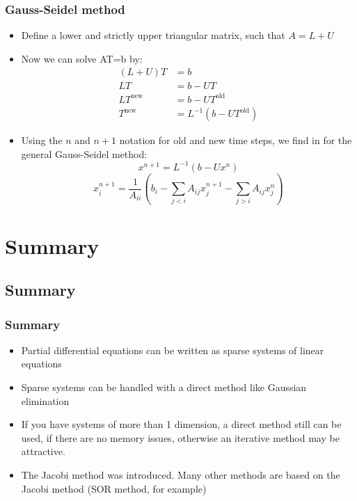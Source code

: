 \begin{frame}[fragile]
  \frametitle{Gauss-Seidel method}
  \begin{itemize}
    \item Define a lower and strictly upper triangular matrix, such that $A = L + U$
    \item Now we can solve AT=b by:
    \begin{align*}
      (L+U)T &= b \\
      LT &= b - UT \\
      LT^\text{new} &= b - UT^\text{old} \\
      T^\text{new} &= L^{-1}(b-UT^\text{old})
   \end{align*}
     \item Using the $n$ and $n+1$ notation for old and new time steps, we find in for the general Gauss-Seidel method:
     \[
      x^{n+1} = L^{-1}\left(b-Ux^n\right)
     \]
     \[
      x_i^{n+1} = \frac{1}{A_{ii}}\left(b_i - \sum_{j<i} A_{ij}x_j^{n+1}- \sum_{j>i} A_{ij}x_j^n\right)
     \]
  \end{itemize}
\end{frame}

\section{Summary}
\subsection*{Summary}
\begin{frame}[fragile]
  \frametitle{Summary}
  \begin{itemize}
   \item Partial differential equations can be written as sparse systems of linear equations
   \item Sparse systems can be handled with a direct method like Gaussian elimination
    \item If you have systems of more than 1 dimension, a direct method still can be used, if there are no memory issues, otherwise an iterative method may be attractive.
    \item The Jacobi method was introduced. Many other methods are based on the Jacobi method (SOR method, for example)
  \end{itemize}
\end{frame}